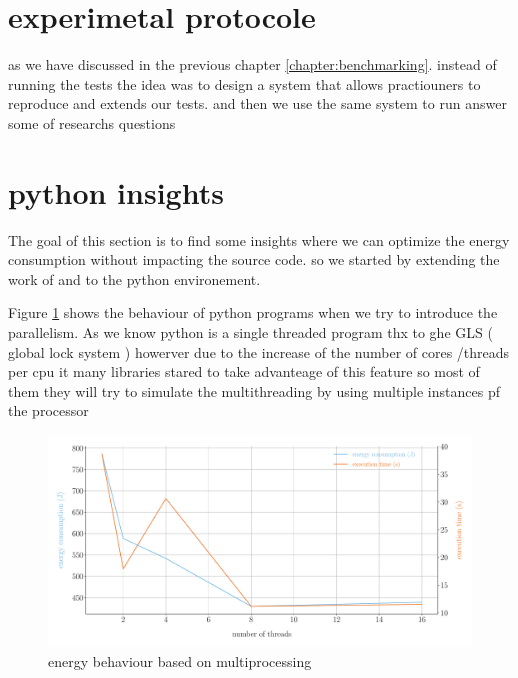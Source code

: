 \newpage
\section{experimetal protocole}

as we have discussed in the previous chapter \ref{chapter:benchmarking}. instead of running the tests the idea was to design a system that allows practiouners to reproduce and extends our tests. and then we use the same system to run answer some of researchs questions

\section{python insights}

The goal of this section is to find some insights where we can optimize the energy consumption without impacting the source code. so we started by extending the work of \citeauthor{hasan_energy_2016} and \citeauthor{oliveira_recommending_nodate} to the python environement.




Figure \ref{fig:python_multiprocessing} shows the behaviour of python programs when we try to introduce the parallelism.
As we know python is a single threaded program thx to ghe GLS ( global lock system ) howerver due to the increase of the number of cores /threads per cpu it many libraries stared to take advanteage of this feature so most of them they will try to simulate the multithreading by using multiple instances pf the processor %

\begin{figure}[hbt]
    \centering
    \includegraphics[width=\linewidth]{imgs/multiprocessing_energyvstime}
    \caption{energy behaviour based on multiprocessing}
    \label{fig:python_multiprocessing}
\end{figure}

